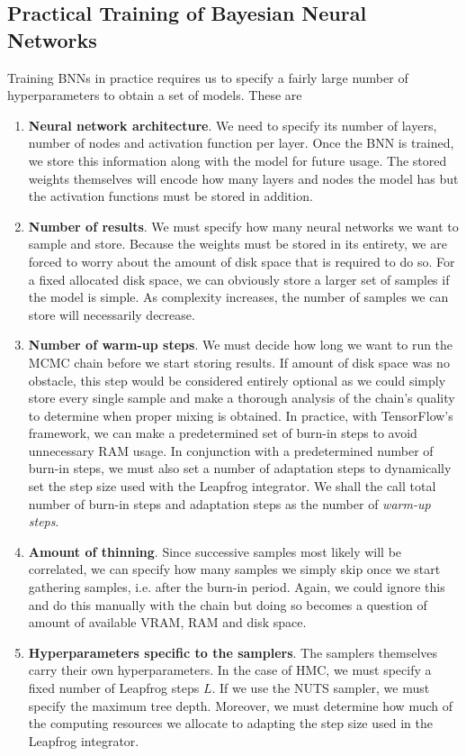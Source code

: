 \subsection{Practical Training of Bayesian Neural Networks}\label{sec:practical_bnn}

Training BNNs in practice requires us to specify a fairly large number of hyperparameters to obtain a set of models. These are 
\begin{enumerate}
  \item \textbf{Neural network architecture}. We need to specify its number of layers, number of nodes and activation function per layer. 
  Once the BNN is trained, we store this information along with the model for future usage. The stored weights themselves will encode how many layers and nodes the model has but the activation functions must be stored in addition.
  \item \textbf{Number of results}. We must specify how many neural networks we want to sample and store. Because the weights must be stored in its entirety, we are forced to worry about the amount of disk space that is required to do so. For a fixed allocated disk space, we can obviously store a larger set of samples if the model is simple. As complexity increases, the number of samples we can store will necessarily decrease.
  \item \textbf{Number of warm-up steps}. We must decide how long we want to run the MCMC chain before we start storing results. If amount of disk space was no obstacle, this step would be considered entirely optional as we could simply store every single sample and make a thorough analysis of the chain's quality to determine when proper mixing is obtained. In practice, with TensorFlow's framework, we can make a predetermined set of burn-in steps to avoid unnecessary RAM usage. In conjunction with a predetermined number of burn-in steps, we must also set a number of adaptation steps to dynamically set the step size used with the Leapfrog integrator. We shall the call total number of burn-in steps and adaptation steps as the number of \textit{warm-up steps}.
  \item \textbf{Amount of thinning}. Since successive samples most likely will be correlated, we can specify how many samples we simply skip once we start gathering samples, i.e. after the burn-in period. Again, we could ignore this and do this manually with the chain but doing so becomes a question of amount of available VRAM, RAM and disk space. 
  \item \textbf{Hyperparameters specific to the samplers}. The samplers themselves carry their own hyperparameters. In the case of HMC, we must specify a fixed number of Leapfrog steps $L$. If we use the NUTS sampler, we must specify the maximum tree depth. Moreover, we must determine how much of the computing resources we allocate to adapting the step size used in the Leapfrog integrator.

\end{enumerate}
